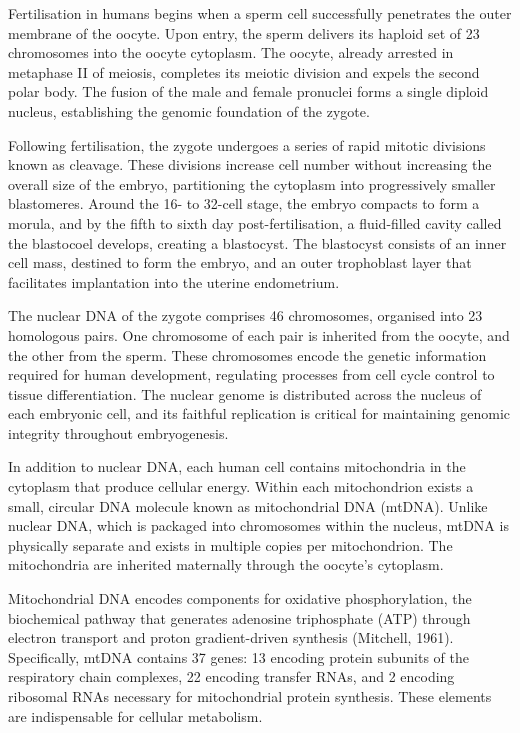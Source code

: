 Fertilisation in humans begins when a sperm cell successfully penetrates the outer membrane of the oocyte. Upon entry, the sperm delivers its haploid set of 23 chromosomes into the oocyte cytoplasm. The oocyte, already arrested in metaphase II of meiosis, completes its meiotic division and expels the second polar body. The fusion of the male and female pronuclei forms a single diploid nucleus, establishing the genomic foundation of the zygote.

Following fertilisation, the zygote undergoes a series of rapid mitotic divisions known as cleavage. These divisions increase cell number without increasing the overall size of the embryo, partitioning the cytoplasm into progressively smaller blastomeres. Around the 16- to 32-cell stage, the embryo compacts to form a morula, and by the fifth to sixth day post-fertilisation, a fluid-filled cavity called the blastocoel develops, creating a blastocyst. The blastocyst consists of an inner cell mass, destined to form the embryo, and an outer trophoblast layer that facilitates implantation into the uterine endometrium.

The nuclear DNA of the zygote comprises 46 chromosomes, organised into 23 homologous pairs. One chromosome of each pair is inherited from the oocyte, and the other from the sperm. These chromosomes encode the genetic information required for human development, regulating processes from cell cycle control to tissue differentiation. The nuclear genome is distributed across the nucleus of each embryonic cell, and its faithful replication is critical for maintaining genomic integrity throughout embryogenesis.

In addition to nuclear DNA, each human cell contains mitochondria in the cytoplasm that produce cellular energy. Within each mitochondrion exists a small, circular DNA molecule known as mitochondrial DNA (mtDNA). Unlike nuclear DNA, which is packaged into chromosomes within the nucleus, mtDNA is physically separate and exists in multiple copies per mitochondrion. The mitochondria are inherited maternally through the oocyte's cytoplasm.

Mitochondrial DNA encodes components for oxidative phosphorylation, the biochemical pathway that generates adenosine triphosphate (ATP) through electron transport and proton gradient-driven synthesis (Mitchell, 1961). Specifically, mtDNA contains 37 genes: 13 encoding protein subunits of the respiratory chain complexes, 22 encoding transfer RNAs, and 2 encoding ribosomal RNAs necessary for mitochondrial protein synthesis. These elements are indispensable for cellular metabolism.


